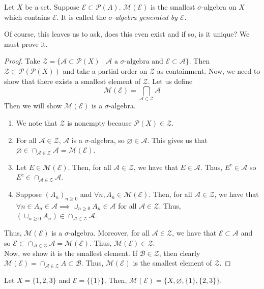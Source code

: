 \documentclass[11pt,leqno,oneside]{amsbook}
\numberwithin{thm}{section}
\renewcommand{\P}{\mathcal{P}}
\renewcommand{\A}{\mathcal{A}}
\newcommand{\M}{\mathcal{M}}
\newcommand{\Ep}{\mathcal{E}}
\begin{document}
\begin{defn}
  Let $X$ be a set. Suppose $\Ep \subset \P(A)$. $\M(\Ep)$ is the
  smallest $\sigma$-algebra on $X$ which contains $\Ep$.  It is called the
  \emph{$\sigma$-algebra generated by $\Ep$}.
\end{defn}
Of course, this leaves us to ask, does this even exist and if so, is
it unique? We must prove it.
\begin{proof}
  Take $\mathcal{Z} = \{\A \subset \P(X) \mid \A \text{ a }
  \sigma\text{-algebra and } \Ep \subset \A\}$. Then $\mathcal{Z}
  \subset \P(\P(X))$ and take a partial order on $\mathcal{Z}$ as
  containment. Now, we need to show that there exists a smallest
  element of $\mathcal{Z}$. Let us define \[
    \M(\Ep) = \bigcap_{\A \in \mathcal{Z}} \A
  \]
  Then we will show $\M(\Ep)$ is a $\sigma$-algebra.
  \begin{enumerate}
  \item We note that $\mathcal{Z}$ is nonempty because $\P(X) \in \mathcal{Z}$.
  \item For all $\A \in \mathcal{Z}$, $\A$ is a $\sigma$-algebra, so
    $\varnothing \in \A$. This gives us that $\varnothing \in \cap_{\A
      \in \mathcal{Z}} \A = \M(\Ep)$.
  \item Let $E \in \M(\Ep)$. Then, for all $\A \in \mathcal{Z}$, we have that
    $E \in \A$. Thus, $E^c \in \A$ so $E^c \in \cap_{\A \in \mathcal{Z}} \A$.
  \item Suppose $(A_n)_{n \geq 0}$ and $\forall n, A_n \in
    \M(\Ep)$. Then, for all $\A \in \mathcal{Z}$, we have that $\forall n \in
    A_n \in \A \implies \cup_{n \geq 0} A_n \in \A$ for all $\A
    \in \mathcal{Z}$. Thus, $(\cup_{n \geq 0} A_n) \in \cap_{\A \in \mathcal{Z}} \A$.
  \end{enumerate}
  Thus, $\M(\Ep)$ is a $\sigma$-algebra. Moreover, for all $\A \in
  \mathcal{Z}$, we have that $\Ep \subset \A$ and so $\Ep \subset \cap_{\A \in
    \mathcal{Z}} \A = \M(\Ep)$. Thus, $\M(\Ep) \in \mathcal{Z}$. \\

  Now, we show it is the smallest element. If $\mathscr{B} \in
  \mathcal{Z}$, then clearly $\M(\Ep) = \cap_{\A \in \mathcal{Z}} A
  \subset \mathscr{B}$. Thus, $\M(\Ep)$ is the smallest element of
  $\mathcal{Z}$.
\end{proof}
\begin{example}
  Let $X = \{1,2,3\}$ and $\Ep = \{\{1\}\}$. Then, $\M(\Ep) = \{X,
  \varnothing, \{1\},\{2,3\}\}$.
\end{example}
\end{document}
